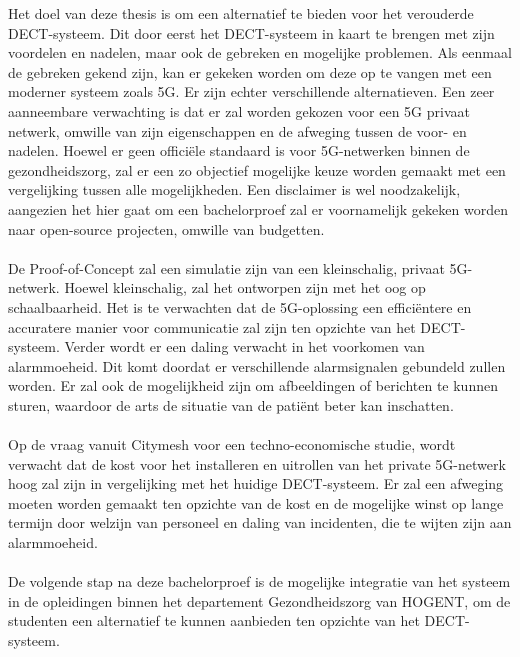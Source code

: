 Het doel van deze thesis is om een alternatief te bieden voor het verouderde DECT-systeem. Dit door eerst het DECT-systeem in kaart te brengen met zijn voordelen en nadelen, maar ook de gebreken en mogelijke problemen. Als eenmaal de gebreken gekend zijn, kan er gekeken worden om deze op te vangen met een moderner systeem zoals 5G. Er zijn echter verschillende alternatieven. Een zeer aanneembare verwachting is dat er zal worden gekozen voor een 5G privaat netwerk, omwille van zijn eigenschappen en de afweging tussen de voor- en nadelen. Hoewel er geen officiële standaard is voor 5G-netwerken binnen de gezondheidszorg, zal er een zo objectief mogelijke keuze worden gemaakt met een vergelijking tussen alle mogelijkheden. Een disclaimer is wel noodzakelijk, aangezien het hier gaat om een bachelorproef zal er voornamelijk gekeken worden naar open-source projecten, omwille van budgetten. \\\\
De Proof-of-Concept zal een simulatie zijn van een kleinschalig, privaat 5G-netwerk. Hoewel kleinschalig, zal het ontworpen zijn met het oog op schaalbaarheid. Het is te verwachten dat de 5G-oplossing een efficiëntere en accuratere manier voor communicatie zal zijn ten opzichte van het DECT-systeem. Verder wordt er een daling verwacht in het voorkomen van alarmmoeheid. Dit komt doordat er verschillende alarmsignalen gebundeld zullen worden. Er zal ook de mogelijkheid zijn om afbeeldingen of berichten te kunnen sturen, waardoor de arts de situatie van de patiënt beter kan inschatten.\\\\
Op de vraag vanuit Citymesh voor een techno-economische studie, wordt verwacht dat de kost voor het installeren en uitrollen van het private 5G-netwerk hoog zal zijn in vergelijking met het huidige DECT-systeem. Er zal een afweging moeten worden gemaakt ten opzichte van de kost en de mogelijke winst op lange termijn door welzijn van personeel en daling van incidenten, die te wijten zijn aan alarmmoeheid.\\\\
De volgende stap na deze bachelorproef is de mogelijke integratie van het systeem in de opleidingen binnen het departement Gezondheidszorg van HOGENT, om de studenten een alternatief te kunnen aanbieden ten opzichte van het DECT-systeem.